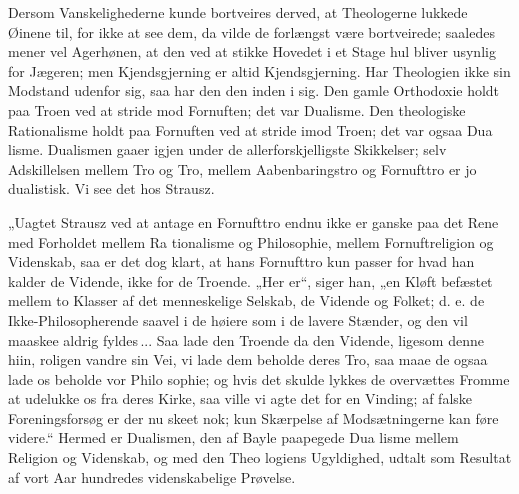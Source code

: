\documentclass[12pt]{book}
\newcommand{\opage}[1]{\marginnote{\footnotesize\textit{[#1]}}}
\begin{document}
Dersom Vanskelighederne kunde bortveires derved,
at Theologerne lukkede Øinene til, for ikke at see dem,
da vilde de forlængst være bortveirede; saaledes mener
vel Agerhønen, at den ved at stikke Hovedet i et Stage\-%
hul bliver usynlig for Jægeren; men Kjendsgjerning er
altid Kjendsgjerning. Har Theologien ikke sin Modstand
udenfor sig, saa har den den inden i sig. Den gamle
Orthodoxie holdt paa Troen ved at stride mod Fornuften;
det var Dualisme. Den theologiske Rationalisme holdt
paa Fornuften ved at stride imod Troen; det var ogsaa Dua\-%
lisme. Dualismen gaaer igjen under de allerforskjelligste
Skikkelser; selv Adskillelsen mellem Tro og Tro, mellem
\opage{271}\setcounter{footnote}{0}%
Aabenbaringstro og Fornufttro er jo dualistisk. Vi see
det hos Strausz.

„Uagtet Strausz ved at antage en Fornufttro endnu
ikke er ganske paa det Rene med Forholdet mellem Ra\-%
tionalisme og Philosophie, mellem Fornuftreligion og
Videnskab, saa er det dog klart, at hans Fornufttro kun
passer for hvad han kalder de Vidende, ikke for de
Troende. „Her er“, siger han, „en Kløft befæstet mellem
to Klasser af det menneskelige Selskab, de Vidende og
Folket; d. e. de Ikke-Philosopherende saavel i de høiere
som i de lavere Stænder, og den vil maaskee aldrig
fyldes\,... Saa lade den Troende da den Vidende, ligesom
denne hiin, roligen vandre sin Vei, vi lade dem beholde
deres Tro, saa maae de ogsaa lade os beholde vor Philo\-%
sophie; og hvis det skulde lykkes de overvættes Fromme
at udelukke os fra deres Kirke, saa ville vi agte det for
en Vinding; af falske Foreningsforsøg er der nu skeet
nok; kun Skærpelse af Modsætningerne kan føre videre.“
Hermed er Dualismen, den af Bayle paapegede Dua\-%
lisme mellem Religion og Videnskab, og med den Theo\-%
logiens Ugyldighed, udtalt som Resultat af vort Aar\-%
hundredes videnskabelige Prøvelse.
\end{document}

